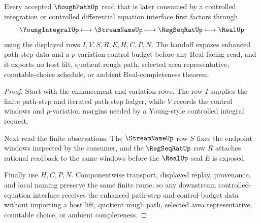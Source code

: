 \begin{theorem}
\label{thm:rough-path-p-variation-handoff}
Every accepted $\RoughPathUp$ read that is later consumed by a controlled integration or controlled differential equation interface first factors through
$$
\YoungIntegralUp \longmapsto \StreamNameUp \longmapsto \RegSeqRatUp \longmapsto \RealUp
$$
using the displayed rows $I,V,S,R,E,H,C,P,N$. The handoff exposes enhanced path-step data and a $p$-variation control budget before any Real-facing read, and it exports no host lift, quotient rough path, selected area representative, countable-choice schedule, or ambient Real-completeness theorem.
\end{theorem}
\begin{proof}
Start with the enhancement and variation rows. The row $I$ supplies the finite path-step and iterated path-step ledger, while $V$ records the control windows and $p$-variation margins needed by a Young-style controlled integral request.

Next read the finite observations. The $\StreamNameUp$ row $S$ fixes the endpoint windows inspected by the consumer, and the $\RegSeqRatUp$ row $R$ attaches rational readback to the same windows before the $\RealUp$ seal $E$ is exposed.

Finally use $H,C,P,N$. Componentwise transport, displayed replay, provenance, and local naming preserve the same finite route, so any downstream controlled-equation interface receives the enhanced path-step and control-budget data without importing a host lift, quotient rough path, selected area representative, countable choice, or ambient completeness.
\end{proof}




